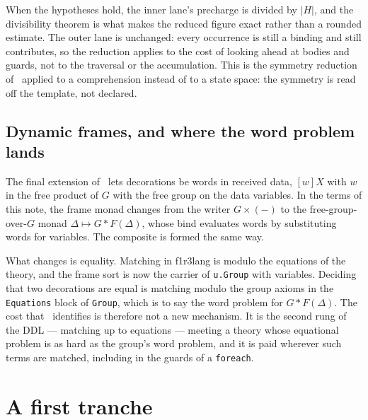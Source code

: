 \documentclass[11pt]{article}
\theoremstyle{branddef}
\theoremstyle{brandplain}
\theoremstyle{brandrem}
\newcommand{\fe}{\texttt{foreach}}
\newcommand{\flang}{\textsf{f1r3lang}}
\begin{document}
When the hypotheses hold, the inner lane's precharge is divided by \(|H|\),
and the divisibility theorem is what makes the reduced figure exact rather than
a rounded estimate. The outer lane is unchanged: every occurrence is still a
binding and still contributes, so the reduction applies to the cost of looking
ahead at bodies and guards, not to the traversal or the accumulation. This
is the symmetry reduction of~\cite{Oriented} applied to a comprehension instead
of to a state space: the symmetry is read off the template, not declared.

\subsection{Dynamic frames, and where the word problem lands}

The final extension of~\cite{Oriented} lets decorations be words in received
data, \([w]X\) with \(w\) in the free product of \(G\) with the free group on
the data variables. In the terms of this note, the frame monad changes from
the writer \(G\times(-)\) to the free-group-over-\(G\) monad
\(\Delta\mapsto G * F(\Delta)\), whose bind evaluates words by substituting
words for variables. The composite is formed the same way.

What changes is equality. Matching in \flang{} is modulo the equations of the
theory, and the frame sort is now the carrier of \texttt{u.Group} with variables.
Deciding that two decorations are equal is matching modulo the group axioms in
the \texttt{Equations} block of \texttt{Group}, which is to say the word problem
for \(G * F(\Delta)\). The cost that~\cite{Oriented} identifies is therefore
not a new mechanism. It is the second rung of the DDL --- matching up to
equations --- meeting a theory whose equational problem is as hard as the group's
word problem, and it is paid wherever such terms are matched, including in the
guards of a \fe{}.

\section{A first tranche}
\label{sec:tranche}
\end{document}
